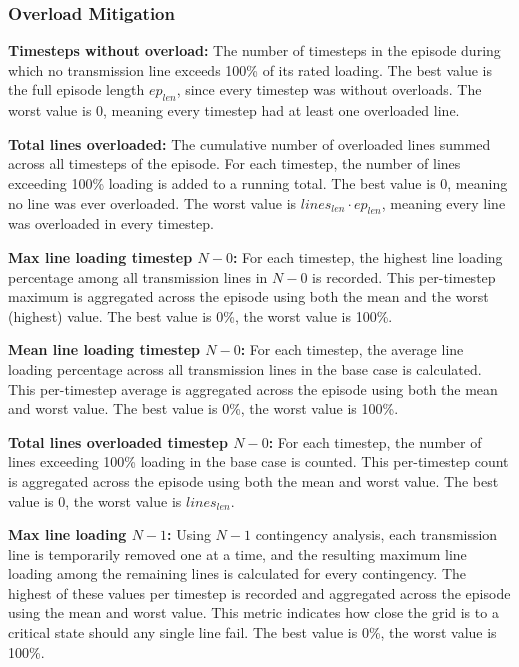 \FloatBarrier

\subsubsection{Overload Mitigation}
\label{app:metrics_overload_mitigation}

\textbf{Timesteps without overload:} The number of timesteps in the episode during which no transmission line exceeds 100\% of its rated loading. The best value is the full episode length $ep_{len}$, since every timestep was without overloads. The worst value is 0, meaning every timestep had at least one overloaded line.

\textbf{Total lines overloaded:} The cumulative number of overloaded lines summed across all timesteps of the episode. For each timestep, the number of lines exceeding 100\% loading is added to a running total. The best value is 0, meaning no line was ever overloaded. The worst value is $lines_{len} \cdot ep_{len}$, meaning every line was overloaded in every timestep.

\textbf{Max line loading timestep $N-0$:} For each timestep, the highest line loading percentage among all transmission lines in $N-0$ is recorded. This per-timestep maximum is aggregated across the episode using both the mean and the worst (highest) value. The best value is 0\%, the worst value is 100\%.

\textbf{Mean line loading timestep $N-0$:} For each timestep, the average line loading percentage across all transmission lines in the base case is calculated. This per-timestep average is aggregated across the episode using both the mean and worst value. The best value is 0\%, the worst value is 100\%.

\textbf{Total lines overloaded timestep $N-0$:} For each timestep, the number of lines exceeding 100\% loading in the base case is counted. This per-timestep count is aggregated across the episode using both the mean and worst value. The best value is 0, the worst value is $lines_{len}$.

\textbf{Max line loading $N-1$:} Using $N-1$ contingency analysis, each transmission line is temporarily removed one at a time, and the resulting maximum line loading among the remaining lines is calculated for every contingency. The highest of these values per timestep is recorded and aggregated across the episode using the mean and worst value. This metric indicates how close the grid is to a critical state should any single line fail. The best value is 0\%, the worst value is 100\%.

